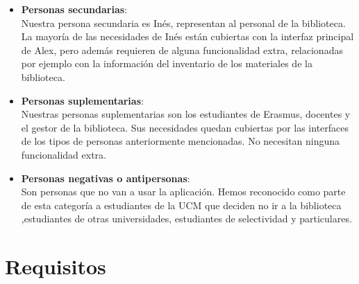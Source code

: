 \documentclass[12pt]{article}
\begin{document}
\begin{itemize}
\begin{itemize}
	\item \textbf{Personas secundarias}: \\
		Nuestra persona secundaria es Inés, representan al personal de la biblioteca. La mayoría de las necesidades de Inés están cubiertas con la interfaz principal de Alex, pero además requieren de alguna funcionalidad extra, relacionadas por ejemplo con la información del inventario de los materiales de la biblioteca.
		
	\item \textbf{Personas suplementarias}: \\
		Nuestras personas suplementarias son los estudiantes de Erasmus, docentes y el gestor de la biblioteca. Sus necesidades quedan cubiertas por las interfaces de los tipos de personas anteriormente mencionadas. No necesitan ninguna funcionalidad extra.

	\item \textbf{Personas negativas o antipersonas}: \\
		Son personas que no van a usar la aplicación. Hemos reconocido como parte de esta categoría a  estudiantes de la UCM que deciden no ir a la biblioteca ,estudiantes de otras universidades, estudiantes de selectividad y particulares. 
		
\end{itemize}
\end{itemize}

\newpage
\section{Requisitos}
\end{document}
